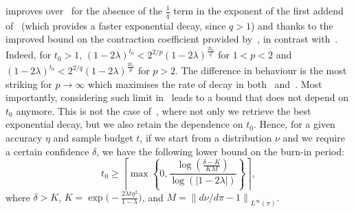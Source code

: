 \documentclass[11pt]{article}
\theoremstyle{plain}
\theoremstyle{remark}
\begin{document}
 improves over~ for the absence of the $\frac1q$ term in the exponent of the first addend of~ (which provides a faster exponential decay, since $q>1$) and  thanks to the improved bound on the contraction coefficient provided by~, in contrast with~. Indeed, for $t_0>1$, %
$(1-2\lambda)^{t_0} < 2^{2/p}(1-2\lambda)^{\frac{2t_0}{q}}$ for $1<p<2$ and  
     $(1-2\lambda)^{t_0} < 2^{2/q}(1-2\lambda)^{\frac{2t_0}{p}}$ for $p>2$.
The difference in behaviour is the most striking for $p\to\infty$ which maximises the rate of decay in both~ and~. %
Most importantly, considering such limit in~ leads to a bound that does not depend on $t_0$ anymore. This is not the case of~, where not only we retrieve the best exponential decay, but we also retain the dependence on $t_0$. Hence, for a given accuracy $\eta$ and sample budget $t$, if we start from a distribution $\nu$ and we require a certain confidence $\delta$, we have the following lower bound on the burn-in period:
\begin{equation}
    t_0 \geq \left\lceil\max\left\{0,\frac{\log\left(\frac{\delta-K}{KM}\right)}{\log(|1-2\lambda|)}\right\}\right\rceil,
\end{equation}
where $\delta>K$, $K=\exp\big(-\frac{2\lambda t\eta^2}{1-\lambda}\big)$, and $M=\left\lVert d\nu/d\pi - 1\right\rVert_{L^\infty(\pi)}$.
\fi


\end{document}
